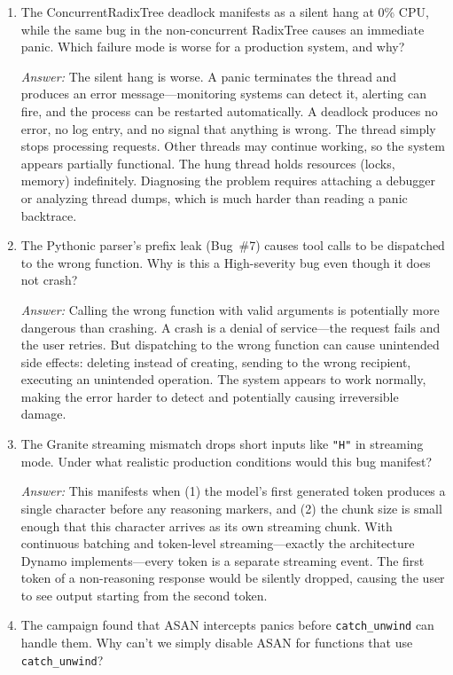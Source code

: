 \begin{enumerate}
  \item The ConcurrentRadixTree deadlock manifests as a silent hang at 0\% CPU, while the same bug in the non-concurrent RadixTree causes an immediate panic. Which failure mode is worse for a production system, and why?

  \emph{Answer:} The silent hang is worse. A panic terminates the thread and produces an error message---monitoring systems can detect it, alerting can fire, and the process can be restarted automatically. A deadlock produces no error, no log entry, and no signal that anything is wrong. The thread simply stops processing requests. Other threads may continue working, so the system appears partially functional. The hung thread holds resources (locks, memory) indefinitely. Diagnosing the problem requires attaching a debugger or analyzing thread dumps, which is much harder than reading a panic backtrace.

  \item The Pythonic parser's prefix leak (Bug~\#7) causes tool calls to be dispatched to the wrong function. Why is this a High-severity bug even though it does not crash?

  \emph{Answer:} Calling the wrong function with valid arguments is potentially more dangerous than crashing. A crash is a denial of service---the request fails and the user retries. But dispatching to the wrong function can cause unintended side effects: deleting instead of creating, sending to the wrong recipient, executing an unintended operation. The system appears to work normally, making the error harder to detect and potentially causing irreversible damage.

  \item The Granite streaming mismatch drops short inputs like \texttt{"H"} in streaming mode. Under what realistic production conditions would this bug manifest?

  \emph{Answer:} This manifests when (1) the model's first generated token produces a single character before any reasoning markers, and (2) the chunk size is small enough that this character arrives as its own streaming chunk. With continuous batching and token-level streaming---exactly the architecture Dynamo implements---every token is a separate streaming event. The first token of a non-reasoning response would be silently dropped, causing the user to see output starting from the second token.

  \item The campaign found that ASAN intercepts panics before \texttt{catch\_unwind} can handle them. Why can't we simply disable ASAN for functions that use \texttt{catch\_unwind}?


\end{enumerate}
